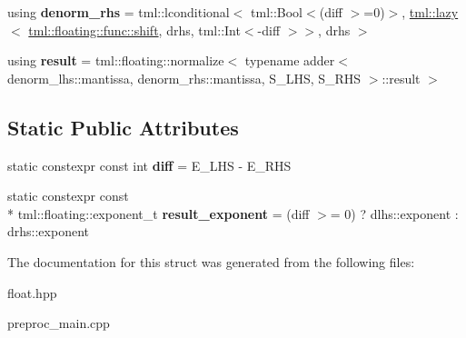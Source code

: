 \begin{DoxyCompactItemize}
\item 
\hypertarget{structtml_1_1add_3_01tml_1_1floating_1_1number_3_01S__LHS_00_01E__LHS_00_01M__LHS_01_4_00_01tml_bcc37312d9cac834cee3a6666bbc4d1c_a432f0efd40081f16e7dbf3689a96a458}{using {\bfseries denorm\+\_\+rhs} = tml\+::lconditional$<$ tml\+::\+Bool$<$(diff $>$=0)$>$, \hyperlink{structtml_1_1lazy}{tml\+::lazy}$<$ \hyperlink{structtml_1_1floating_1_1impl_1_1shift}{tml\+::floating\+::func\+::shift}, drhs, tml\+::\+Int$<$-\/diff $>$$>$, drhs $>$}\label{structtml_1_1add_3_01tml_1_1floating_1_1number_3_01S__LHS_00_01E__LHS_00_01M__LHS_01_4_00_01tml_bcc37312d9cac834cee3a6666bbc4d1c_a432f0efd40081f16e7dbf3689a96a458}

\item 
\hypertarget{structtml_1_1add_3_01tml_1_1floating_1_1number_3_01S__LHS_00_01E__LHS_00_01M__LHS_01_4_00_01tml_bcc37312d9cac834cee3a6666bbc4d1c_afdf0f364a6ec33338a7dc9c8108d6f5e}{using {\bfseries result} = tml\+::floating\+::normalize$<$ typename adder$<$ denorm\+\_\+lhs\+::mantissa, denorm\+\_\+rhs\+::mantissa, S\+\_\+\+L\+H\+S, S\+\_\+\+R\+H\+S $>$\+::result $>$}\label{structtml_1_1add_3_01tml_1_1floating_1_1number_3_01S__LHS_00_01E__LHS_00_01M__LHS_01_4_00_01tml_bcc37312d9cac834cee3a6666bbc4d1c_afdf0f364a6ec33338a7dc9c8108d6f5e}

\end{DoxyCompactItemize}
\subsection*{Static Public Attributes}
\begin{DoxyCompactItemize}
\item 
\hypertarget{structtml_1_1add_3_01tml_1_1floating_1_1number_3_01S__LHS_00_01E__LHS_00_01M__LHS_01_4_00_01tml_bcc37312d9cac834cee3a6666bbc4d1c_a0ec8e7df05b9b109ffdaa41e833c5be9}{static constexpr const int {\bfseries diff} = E\+\_\+\+L\+H\+S -\/ E\+\_\+\+R\+H\+S}\label{structtml_1_1add_3_01tml_1_1floating_1_1number_3_01S__LHS_00_01E__LHS_00_01M__LHS_01_4_00_01tml_bcc37312d9cac834cee3a6666bbc4d1c_a0ec8e7df05b9b109ffdaa41e833c5be9}

\item 
\hypertarget{structtml_1_1add_3_01tml_1_1floating_1_1number_3_01S__LHS_00_01E__LHS_00_01M__LHS_01_4_00_01tml_bcc37312d9cac834cee3a6666bbc4d1c_ab759cd009af85d717490a00d1c9c753c}{static constexpr const \\*
tml\+::floating\+::exponent\+\_\+t {\bfseries result\+\_\+exponent} = (diff $>$= 0) ? dlhs\+::exponent \+: drhs\+::exponent}\label{structtml_1_1add_3_01tml_1_1floating_1_1number_3_01S__LHS_00_01E__LHS_00_01M__LHS_01_4_00_01tml_bcc37312d9cac834cee3a6666bbc4d1c_ab759cd009af85d717490a00d1c9c753c}

\end{DoxyCompactItemize}


The documentation for this struct was generated from the following files\+:\begin{DoxyCompactItemize}
\item 
float.\+hpp\item 
preproc\+\_\+main.\+cpp\end{DoxyCompactItemize}
